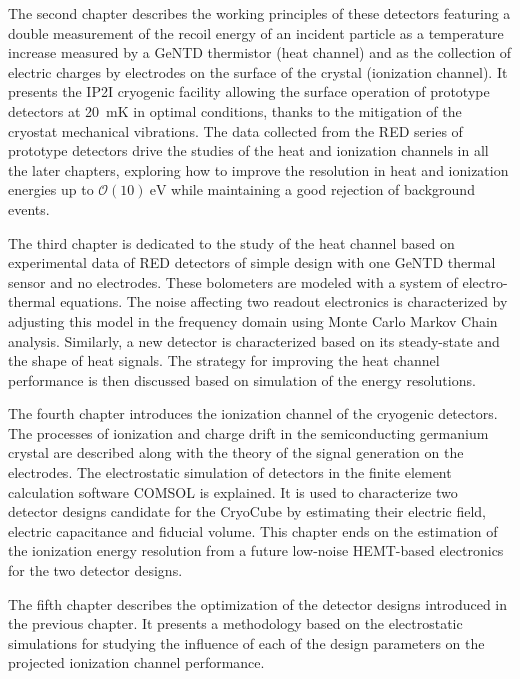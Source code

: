 The second chapter describes the working principles of these detectors featuring a double measurement of the recoil energy of an incident particle as a temperature increase measured by a GeNTD thermistor (heat channel) and as the collection of electric charges by electrodes on the surface of the crystal (ionization channel). It presents the IP2I cryogenic facility allowing the surface operation of prototype detectors at \SI{20}{\milli\K} in optimal conditions, thanks to the mitigation of the cryostat mechanical vibrations. The data collected from the RED series of prototype detectors drive the studies of the heat and ionization channels in all the later chapters, exploring how to improve the resolution in heat and ionization energies up to $\mathcal{O}(10)\ \si{\eV}$ while maintaining a good rejection of background events.

The third chapter is dedicated to the study of the heat channel based on experimental data of RED detectors of simple design with one GeNTD thermal sensor and no electrodes. These bolometers are modeled with a system of electro-thermal equations. The noise affecting two readout electronics is characterized by adjusting this model in the frequency domain using Monte Carlo Markov Chain analysis. Similarly, a new detector is characterized based on its steady-state and the shape of heat signals. The strategy for improving the heat channel performance is then discussed based on simulation of the energy resolutions.

The fourth chapter introduces the ionization channel of the cryogenic detectors. The processes of ionization and charge drift in the semiconducting germanium crystal are described along with the theory of the signal generation on the electrodes. The electrostatic simulation of detectors in the finite element calculation software COMSOL\textsuperscript{\textregistered} is explained. It is used to characterize two detector designs candidate for the CryoCube by estimating their electric field, electric capacitance and fiducial volume. This chapter ends on the estimation of the ionization energy resolution from a future low-noise HEMT-based electronics for the two detector designs.

The fifth chapter describes the optimization of the detector designs introduced in the previous chapter. It presents a methodology based on the electrostatic simulations for studying the influence of each of the design parameters on the projected ionization channel performance.

